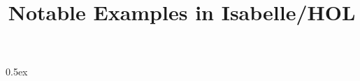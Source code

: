 \documentclass[11pt,a4paper]{article}
\begin{document}
\title{Notable Examples in Isabelle/HOL}
\maketitle

\parindent 0pt \parskip 0.5ex





\end{document}
